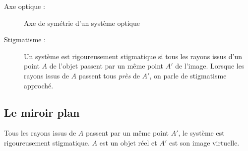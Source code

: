 \documentclass{cours}
\begin{document}
\begin{description}
\item[Axe optique :] Axe de symétrie d'un système optique
\item[Stigmatisme :] Un système est rigoureusement stigmatique si tous les rayons issus d'un point $A$ de l'objet passent par un même point $A'$ de l'image. Lorsque les rayons issus de $A$ passent tous \emph{près} de $A'$, on parle de stigmatisme approché.
\end{description}

\subsection{Le miroir plan}
\begin{center}
\end{center}
Tous les rayons issus de $A$ passent par un même point $A'$, le système est rigoureusement stigmatique. $A$ est un objet réel et $A'$ est son image virtuelle.
\end{document}
